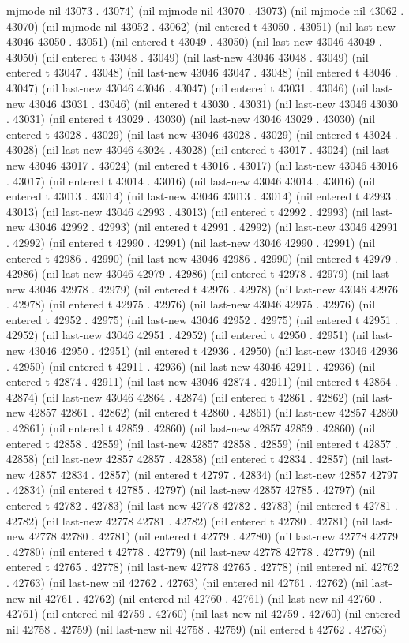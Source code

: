 mjmode nil 43073 . 43074) (nil mjmode nil 43070 . 43073) (nil mjmode nil 43062 . 43070) (nil mjmode nil 43052 . 43062) (nil entered t 43050 . 43051) (nil last-new 43046 43050 . 43051) (nil entered t 43049 . 43050) (nil last-new 43046 43049 . 43050) (nil entered t 43048 . 43049) (nil last-new 43046 43048 . 43049) (nil entered t 43047 . 43048) (nil last-new 43046 43047 . 43048) (nil entered t 43046 . 43047) (nil last-new 43046 43046 . 43047) (nil entered t 43031 . 43046) (nil last-new 43046 43031 . 43046) (nil entered t 43030 . 43031) (nil last-new 43046 43030 . 43031) (nil entered t 43029 . 43030) (nil last-new 43046 43029 . 43030) (nil entered t 43028 . 43029) (nil last-new 43046 43028 . 43029) (nil entered t 43024 . 43028) (nil last-new 43046 43024 . 43028) (nil entered t 43017 . 43024) (nil last-new 43046 43017 . 43024) (nil entered t 43016 . 43017) (nil last-new 43046 43016 . 43017) (nil entered t 43014 . 43016) (nil last-new 43046 43014 . 43016) (nil entered t 43013 . 43014) (nil last-new 43046 43013 . 43014) (nil entered t 42993 . 43013) (nil last-new 43046 42993 . 43013) (nil entered t 42992 . 42993) (nil last-new 43046 42992 . 42993) (nil entered t 42991 . 42992) (nil last-new 43046 42991 . 42992) (nil entered t 42990 . 42991) (nil last-new 43046 42990 . 42991) (nil entered t 42986 . 42990) (nil last-new 43046 42986 . 42990) (nil entered t 42979 . 42986) (nil last-new 43046 42979 . 42986) (nil entered t 42978 . 42979) (nil last-new 43046 42978 . 42979) (nil entered t 42976 . 42978) (nil last-new 43046 42976 . 42978) (nil entered t 42975 . 42976) (nil last-new 43046 42975 . 42976) (nil entered t 42952 . 42975) (nil last-new 43046 42952 . 42975) (nil entered t 42951 . 42952) (nil last-new 43046 42951 . 42952) (nil entered t 42950 . 42951) (nil last-new 43046 42950 . 42951) (nil entered t 42936 . 42950) (nil last-new 43046 42936 . 42950) (nil entered t 42911 . 42936) (nil last-new 43046 42911 . 42936) (nil entered t 42874 . 42911) (nil last-new 43046 42874 . 42911) (nil entered t 42864 . 42874) (nil last-new 43046 42864 . 42874) (nil entered t 42861 . 42862) (nil last-new 42857 42861 . 42862) (nil entered t 42860 . 42861) (nil last-new 42857 42860 . 42861) (nil entered t 42859 . 42860) (nil last-new 42857 42859 . 42860) (nil entered t 42858 . 42859) (nil last-new 42857 42858 . 42859) (nil entered t 42857 . 42858) (nil last-new 42857 42857 . 42858) (nil entered t 42834 . 42857) (nil last-new 42857 42834 . 42857) (nil entered t 42797 . 42834) (nil last-new 42857 42797 . 42834) (nil entered t 42785 . 42797) (nil last-new 42857 42785 . 42797) (nil entered t 42782 . 42783) (nil last-new 42778 42782 . 42783) (nil entered t 42781 . 42782) (nil last-new 42778 42781 . 42782) (nil entered t 42780 . 42781) (nil last-new 42778 42780 . 42781) (nil entered t 42779 . 42780) (nil last-new 42778 42779 . 42780) (nil entered t 42778 . 42779) (nil last-new 42778 42778 . 42779) (nil entered t 42765 . 42778) (nil last-new 42778 42765 . 42778) (nil entered nil 42762 . 42763) (nil last-new nil 42762 . 42763) (nil entered nil 42761 . 42762) (nil last-new nil 42761 . 42762) (nil entered nil 42760 . 42761) (nil last-new nil 42760 . 42761) (nil entered nil 42759 . 42760) (nil last-new nil 42759 . 42760) (nil entered nil 42758 . 42759) (nil last-new nil 42758 . 42759) (nil entered t 42762 . 42763) 